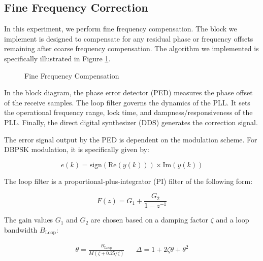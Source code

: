 \documentclass{article}
\begin{document}
\subsection{Fine Frequency Correction}

In this experiment, we perform fine frequency compensation. The block we implement is designed to compensate for any residual phase or frequency offsets remaining after coarse frequency compensation. The algorithm we implemented is specifically illustrated in Figure \ref{fig::fine_freq_comp_block_diagram}.

\begin{figure}[H]
	\centerline{}
	\caption{Fine Frequency Compensation}
	\label{fig::fine_freq_comp_block_diagram}
\end{figure}

In the block diagram, the phase error detector (PED) measures the phase offset of the receive samples. The loop filter governs the dynamics of the PLL. It sets the operational frequency range, lock time, and dampness/responsiveness of the PLL. Finally, the direct digital synthesizer (DDS) generates the correction signal.

The error signal output by the PED is dependent on the modulation scheme. For DBPSK modulation, it is specifically given by:

\begin{equation}
e(k) = \text{sign}(\text{Re}(y(k))) \times \text{Im}(y(k))
\end{equation}

\noindent The loop filter is a proportional-plus-integrator (PI) filter of the following form:

\begin{equation}
F(z) = G_1 + \frac{G_2}{1-z^{-1}}
\end{equation}

\noindent The gain values $G_1$ and $G_2$ are chosen based on a damping factor $\zeta$ and a loop bandwidth $B_\text{Loop}$:

\begin{align}
	\theta = \frac{B_{\text{Loop}}}{M(\zeta + 0.25/\zeta)} && \Delta = 1 + 2\zeta\theta + \theta^2
\end{align}
\end{document}
